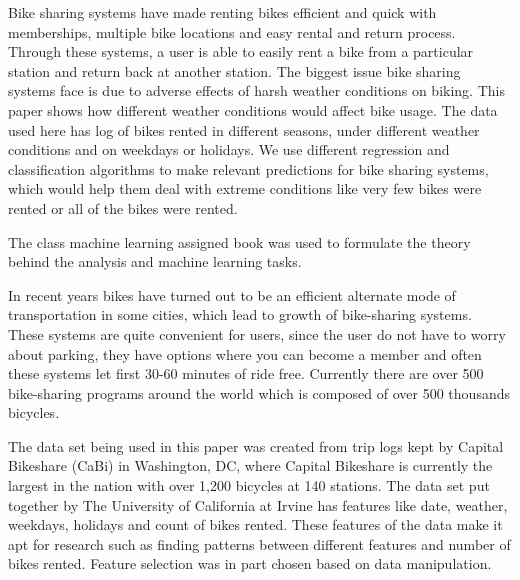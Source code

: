 \documentclass[12pt]{article}
\date{}
\author{\theauthor}
\newcommand{\ci}[1]{\cite{#1}}
\begin{document}
\maketitle
\thispagestyle{empty}
\newpage
\tableofcontents
\newpage


Bike sharing systems have made renting bikes efficient and quick with
memberships, multiple bike locations and easy rental and return
process. Through these systems, a user is able to easily rent a bike from a
particular station and return back at another station. The biggest issue bike
sharing systems face is due to adverse effects of harsh weather conditions on
biking. This paper shows how different weather conditions would affect bike
usage. The data used here has log of bikes rented in different seasons, under
different weather conditions and on weekdays or holidays. We use different
regression and classification algorithms to make relevant predictions for bike
sharing systems, which would help them deal with extreme conditions like very
few bikes were rented or all of the bikes were rented.



The class machine learning assigned book\ci{murphy2012machine} was used to
formulate the theory behind the analysis and machine learning tasks.



In recent years bikes have turned out to be an efficient alternate mode of
transportation in some cities, which lead to growth of bike-sharing
systems. These systems are quite convenient for users, since the user do not
have to worry about parking, they have options where you can become a member
and often these systems let first 30-60 minutes of ride free. Currently there
are over 500 bike-sharing programs around the world which is composed of over
500 thousands bicycles\ci{ucibikeshare}.

The data set being used in this paper was created from trip logs kept by
Capital Bikeshare (CaBi) in Washington, DC, where Capital Bikeshare is
currently the largest in the nation with over 1,200 bicycles at 140
stations. The data set put together by The University of California at Irvine
has features like date, weather, weekdays, holidays and count of bikes
rented. These features of the data make it apt for research such as finding
patterns between different features and number of bikes rented.  Feature
selection was in part chosen based on data manipulation\ci{gebhart2013impact}.
\end{document}
